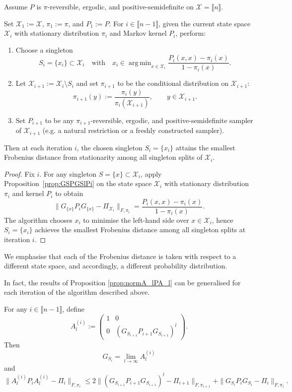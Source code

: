 \documentclass[EJP]{ejpecp} %
\DeclareMathOperator*{\argmin}{arg\,min}
\begin{document}
\begin{proposition}
Assume $P$ is $\pi$-reversible, ergodic, and positive-semidefinite on
$\mathcal X=\llbracket n\rrbracket$.

Set $\mathcal X_1:=\mathcal X$, $\pi_1:=\pi$, and $P_1:=P$.
For $i \in \llbracket n-1 \rrbracket$, given the current state space $\mathcal X_i$ with stationary distribution $\pi_i$ and Markov kernel $P_i$, perform:
\begin{enumerate}
    \item Choose a singleton
    $$S_i=\{x_i\}\subset \mathcal X_i \quad\text{with}\quad x_i\in\argmin_{x\in\mathcal X_i} \frac{P_i(x,x)-\pi_i(x)}{1-\pi_i(x)}.
    $$
    \item Let $\mathcal X_{i+1}:=\mathcal X_i\setminus S_i$ and
    set $\pi_{i+1}$ to be the conditional distribution on $\mathcal X_{i+1}$:
    $$
    \pi_{i+1}(y):=\frac{\pi_i(y)}{\pi_i(\mathcal X_{i+1})},\qquad y\in\mathcal X_{i+1}.
    $$
    \item Set $P_{i+1}$ to be any $\pi_{i+1}$-reversible, ergodic, and positive-semidefinite sampler of $\mathcal{X}_{i+1}$ (e.g. a natural restriction or a freshly constructed sampler).
\end{enumerate}
Then at each iteration $i$, the chosen singleton $S_i=\{x_i\}$ attains the smallest Frobenius distance from stationarity among all singleton splits of $\mathcal X_i$.
\end{proposition}

\begin{proof}
Fix $i$. For any singleton $S=\{x\}\subset\mathcal X_i$, apply
Proposition~\ref{prop:GSPGSlPi} on the state space $\mathcal X_i$ with
stationary distribution $\pi_i$ and kernel $P_i$ to obtain
$$
\|G_{\{x\}}P_iG_{\{x\}}-\Pi_{\mathcal X_i}\|_{F,\pi_i}
=\frac{P_i(x,x)-\pi_i(x)}{1-\pi_i(x)}.
$$
The algorithm chooses $x_i$ to minimise the left-hand side over $x\in\mathcal X_i$,
hence $S_i=\{x_i\}$ achieves the smallest Frobenius distance among all singleton splits
at iteration $i$.
\end{proof}


We emphasise that each of the Frobenius distance is taken with respect to a different state space, and accordingly, a different probability distribution. 

In fact, the results of Proposition \ref{prop:normA_lPA_l} can be generalised for each iteration of the algorithm described above.

\begin{corollary}
    For any $i \in \llbracket n-1\rrbracket$, define
    $$ A_l^{(i)} := \begin{pmatrix}
    1 & 0\\
    0 & (G_{S_{i+1}}P_{i+1}G_{S_{i+1}})^l
    \end{pmatrix}.$$
    Then $$G_{S_i} = \lim_{l \to \infty} A^{(i)}_l$$ and 
    $$\big\|A_l^{(i)} P_i A_l^{(i)} -\Pi_i\big\|_{F, \pi_i} \leq 2\|(G_{S_{i+1}}P_{i+1}G_{S_{i+1}})^l - \Pi_{i+1}\|_{F, \pi_{i+1}} + \|G_{S_i}P_iG_{S_i} - \Pi_i\|_{F, \pi_i}.$$
\end{corollary}
\end{document}
